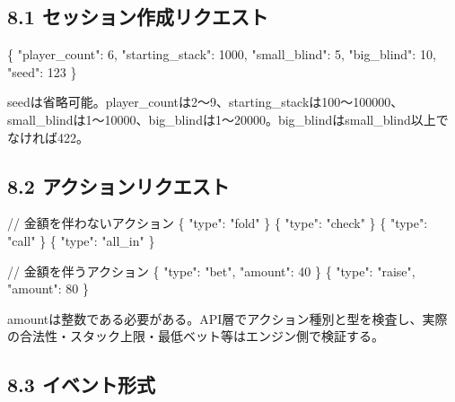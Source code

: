 \documentclass[
]{article}
\newenvironment{Shaded}{}{}
\newcommand{\NormalTok}[1]{#1}
\begin{document}
\subsection{8.1
セッション作成リクエスト}\label{ux30bbux30c3ux30b7ux30e7ux30f3ux4f5cux6210ux30eaux30afux30a8ux30b9ux30c8}

\begin{Shaded}
\begin{Highlighting}[]
\NormalTok{\{}
\NormalTok{  "player\_count": 6,}
\NormalTok{  "starting\_stack": 1000,}
\NormalTok{  "small\_blind": 5,}
\NormalTok{  "big\_blind": 10,}
\NormalTok{  "seed": 123}
\NormalTok{\}}
\end{Highlighting}
\end{Shaded}

seedは省略可能。player\_countは2～9、starting\_stackは100～100000、small\_blindは1～10000、big\_blindは1～20000。big\_blindはsmall\_blind以上でなければ422。

\subsection{8.2
アクションリクエスト}\label{ux30a2ux30afux30b7ux30e7ux30f3ux30eaux30afux30a8ux30b9ux30c8}

\begin{Shaded}
\begin{Highlighting}[]
\NormalTok{// 金額を伴わないアクション}
\NormalTok{\{ "type": "fold" \}}
\NormalTok{\{ "type": "check" \}}
\NormalTok{\{ "type": "call" \}}
\NormalTok{\{ "type": "all\_in" \}}

\NormalTok{// 金額を伴うアクション}
\NormalTok{\{ "type": "bet", "amount": 40 \}}
\NormalTok{\{ "type": "raise", "amount": 80 \}}
\end{Highlighting}
\end{Shaded}

amountは整数である必要がある。API層でアクション種別と型を検査し、実際の合法性・スタック上限・最低ベット等はエンジン側で検証する。

\subsection{8.3
イベント形式}\label{ux30a4ux30d9ux30f3ux30c8ux5f62ux5f0f}
\end{document}
